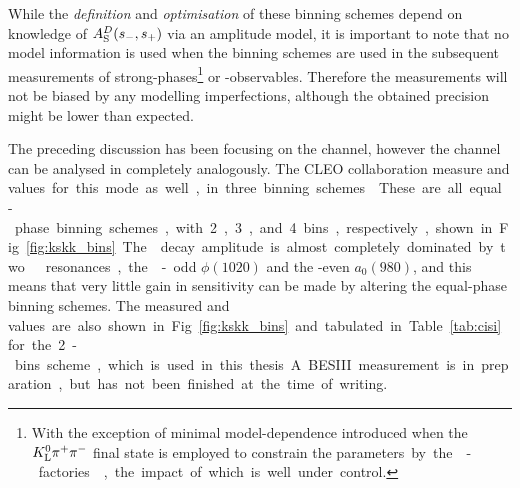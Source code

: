 

While the \emph{definition} and \emph{optimisation} of these binning schemes depend on knowledge of $A_{\rm S}^{D}(s_-, s_+)$ via an amplitude model, it is important to note that no model information is used when the binning schemes are used in the subsequent measurements of strong-phases\footnote{With the exception of minimal model-dependence introduced when the ${{K}^0_{\mathrm{L}}}{{\pi}^+}{{\pi}^-}$ final state is employed to constrain the \si parameters by the \D-factories~\cite{CLEOCISI,BESCISI}, the impact of which is well under control.} or \CP-observables. Therefore the measurements will not be biased by any modelling imperfections, although the obtained precision might be lower than expected. 





The preceding discussion has been focusing on the \DtoKspipi channel, however the \DtoKsKK channel can be analysed in completely analogously. The CLEO collaboration measure \ci and \si values for this mode as well, in three binning schemes~\cite{CLEOCISI}. These are all equal-phase binning schemes, with 2, 3, and 4 bins, respectively, shown in Fig.~\ref{fig:kskk_bins}. The \DtoKsKK decay amplitude is almost completely dominated by two \Kp\Km resonances, the \CP-odd $\phi(1020)$ and the \CP-even  $a_0(980)$, and this means that very little gain in sensitivity can be made by altering the equal-phase binning schemes. The measured \ci and \si values are also shown in Fig.~\ref{fig:kskk_bins} and tabulated in Table~\ref{tab:cisi} for the 2-bins scheme, which is used in this thesis. A BESIII measurement is in preparation, but has not been finished at the time of writing.

